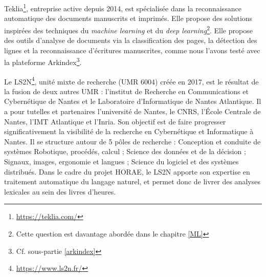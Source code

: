 \documentclass[a4paper,12pt,twoside]{book}
\begin{document}
Teklia\footnote{\url{https://teklia.com/}}, entreprise active depuis 2014, est spécialisée dans la reconnaissance automatique des documents manuscrits et imprimés. Elle propose des solutions inspirées des techniques du \textit{machine learning} et du \textit{deep learning}\footnote{Cette question est davantage abordée dans le chapitre \ref{ML}}. Elle propose des outils d'analyse de documents via la classification des pages, la détection des lignes et la reconnaissance d'écritures manuscrites, comme nous l'avons testé avec la plateforme Arkindex\footnote{Cf. sous-partie \ref{arkindex}}.

Le LS2N\footnote{\url{https://www.ls2n.fr/}}, unité mixte de recherche (UMR 6004) créée en 2017, est le résultat de la fusion de deux autres UMR : l’institut de Recherche en Communications et Cybernétique de Nantes et le Laboratoire d’Informatique de Nantes Atlantique. Il a pour
tutelles et partenaires l’université de Nantes, le CNRS, l’École Centrale de Nantes, l'IMT
Atlantique et l'Inria. Son objectif est de faire progresser significativement la visibilité de la recherche en Cybernétique et Informatique à Nantes. Il se structure autour de 5 pôles de recherche : Conception et conduite de systèmes Robotique, procédés, calcul ; Science des données et de la décision ; Signaux, images, ergonomie et langues ; Science du logiciel et des systèmes distribués. Dans le cadre du projet HORAE, le LS2N apporte son expertise en traitement automatique du langage naturel, et permet donc de livrer des analyses lexicales au sein des livres d'heures. \\
\end{document}
